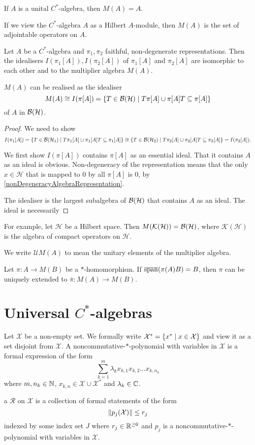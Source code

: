 \begin{lemma}
If $A$ is a unital $C^*$-algebra, then $M(A) = A$.
\end{lemma}
If we view the $C^*$-algebra $A$ as a Hilbert $A$-module, then $M(A)$ is the set of adjointable operators on $A$.

\begin{proposition}
Let $A$ be a $C^*$-algebra and $\pi_1, \pi_2$ faithful, non-degenerate representations. Then the idealisers $I(\pi_1[A]), I(\pi_2[A])$ of $\pi_1[A]$ and $\pi_2[A]$ are isomorphic to each other and to the multiplier algebra $M(A)$.


$M(A)$ can be realised as the idealiser
\[ M(A) \cong I(\pi[A]) = \setbuilder{T\in \Bounded(\mathcal{H})}{T\pi[A] \cup \pi[A]T \subseteq \pi[A]} \]
of $A$ in $\operatorname{\mathcal{B}}(\mathcal{H})$.
\end{proposition}
\begin{proof}
We need to show
\[ I(\pi_1[A]) = \setbuilder{T\in \Bounded(\mathcal{H}_1)}{T\pi_1[A] \cup \pi_1[A]T \subseteq \pi_1[A]} \cong \setbuilder{T\in \Bounded(\mathcal{H}_2)}{T\pi_2[A] \cup \pi_2[A]T \subseteq \pi_2[A]} = I(\pi_2[A]). \]

We first show $I(\pi[A])$ contains $\pi[A]$ as an essential ideal. That it contains $A$ as an ideal is obvious. Non-degeneracy of the representation means that the only $x\in\mathcal{H}$ that is mapped to $0$ by all $\pi[A]$ is $0$, by \ref{nonDegeneracyAlgebraRepresentation}. 

The idealiser is the largest subalgebra of $\operatorname{\mathcal{B}}(\mathcal{H})$ that contains $A$ as an ideal. The ideal is necessarily 
\end{proof}

For example, let $\mathcal{H}$ be a Hilbert space. Then $M(\mathcal{K}(\mathcal{H})) = \operatorname{\mathcal{B}}(\mathcal{H})$, where $\mathcal{K}(\mathcal{H})$ is the algebra of compact operators on $\mathcal{H}$.

We write $\mathcal{U}M(A)$ to mean the unitary elements of the multiplier algebra.

Let $\pi: A\to M(B)$ be a $*$-homomorphism. If $\overline{\operatorname{span}}(\pi(A)B) = B$, then $\pi$ can be uniquely extended to $\overline{\pi}: M(A) \to M(B)$. 

\section{Universal $C^*$-algebras}
\begin{definition}
Let $\mathcal{X}$ be a non-empty set. We formally write $\mathcal{X}^* = \setbuilder{x^*}{x\in \mathcal{X}}$ and view it as a set disjoint from $\mathcal{X}$. A noncommutative-$*$-polynomial with variables in $\mathcal{X}$ is a formal expression of the form
\[ \sum_{k=1}^m\lambda_k x_{k,1}x_{k,2}\ldots x_{k,n_k} \]
where $m, n_k\in \mathbb{N}$, $x_{k,n}\in \mathcal{X}\cup\mathcal{X}^*$ and $\lambda_k\in \mathbb{C}$.

a  $\mathcal{R}$ on $\mathcal{X}$ is a collection of formal statements of the form
\[ \lVert p_j(\mathcal{X})\rVert\leq r_j \]
indexed by some index set $J$ where $r_j \in\mathbb{R}^{\geq 0}$ and $p_j$ is a noncommutative-$*$-polynomial with variables in $\mathcal{X}$.
\end{definition}

